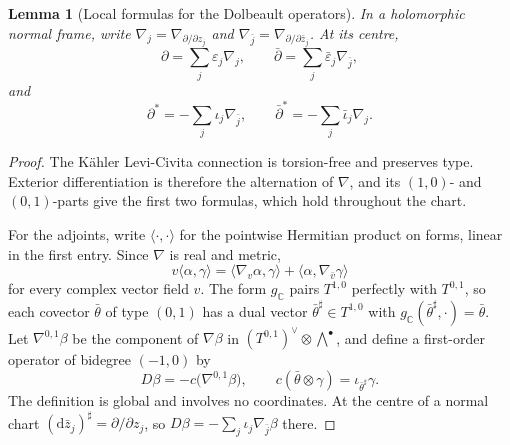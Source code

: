 \documentclass[11pt,reqno]{amsart}
\newtheorem{lemma}[theorem]{Lemma}
\theoremstyle{definition}
\theoremstyle{remark}
\newcommand{\C}{\mathbb{C}}
\newcommand{\dd}{\mathrm{d}}
\newcommand{\dbar}{\bar\partial}
\begin{document}
\begin{lemma}[Local formulas for the Dolbeault operators]
\label{lem:frame-operators}
In a holomorphic normal frame, write
$\nabla_j=\nabla_{\partial/\partial z_j}$ and
$\nabla_{\bar j}=\nabla_{\partial/\partial\bar z_j}$.
At its centre,
\[
\partial=\sum_j\varepsilon_j\nabla_j,
\qquad
\dbar=\sum_j\bar\varepsilon_j\nabla_{\bar j},
\]
and
\[
\partial^*=-\sum_j\iota_j\nabla_{\bar j},
\qquad
\dbar^*=-\sum_j\bar\iota_j\nabla_j.
\]
\end{lemma}

\begin{proof}
The K\"ahler Levi-Civita connection is torsion-free and preserves type.
Exterior differentiation is therefore the alternation of $\nabla$, and its
$(1,0)$- and $(0,1)$-parts give the first two formulas, which hold throughout
the chart.

For the adjoints, write $\langle\cdot,\cdot\rangle$ for the pointwise
Hermitian product on forms, linear in the first entry. Since $\nabla$ is real
and metric,
\begin{equation}
\label{eq:metric-leibniz}
v\langle\alpha,\gamma\rangle
=\langle\nabla_v\alpha,\gamma\rangle
+\langle\alpha,\nabla_{\bar v}\gamma\rangle
\end{equation}
for every complex vector field $v$. The form $g_{\C}$ pairs $T^{1,0}$
perfectly with $T^{0,1}$, so each covector $\bar\theta$ of type $(0,1)$ has a
dual vector $\bar\theta^{\sharp}\in T^{1,0}$ with
$g_{\C}(\bar\theta^{\sharp},\cdot)=\bar\theta$. Let $\nabla^{0,1}\beta$ be the
component of $\nabla\beta$ in $(T^{0,1})^{\vee}\otimes\bigwedge^{\bullet}$,
and define a first-order operator of bidegree $(-1,0)$ by
\[
D\beta=-c\bigl(\nabla^{0,1}\beta\bigr),
\qquad
c(\bar\theta\otimes\gamma)=\iota_{\bar\theta^{\sharp}}\gamma.
\]
The definition is global and involves no coordinates. At the centre of a
normal chart $(\dd\bar z_j)^{\sharp}=\partial/\partial z_j$, so
$D\beta=-\sum_j\iota_j\nabla_{\bar j}\beta$ there.


\end{proof}
\end{document}
